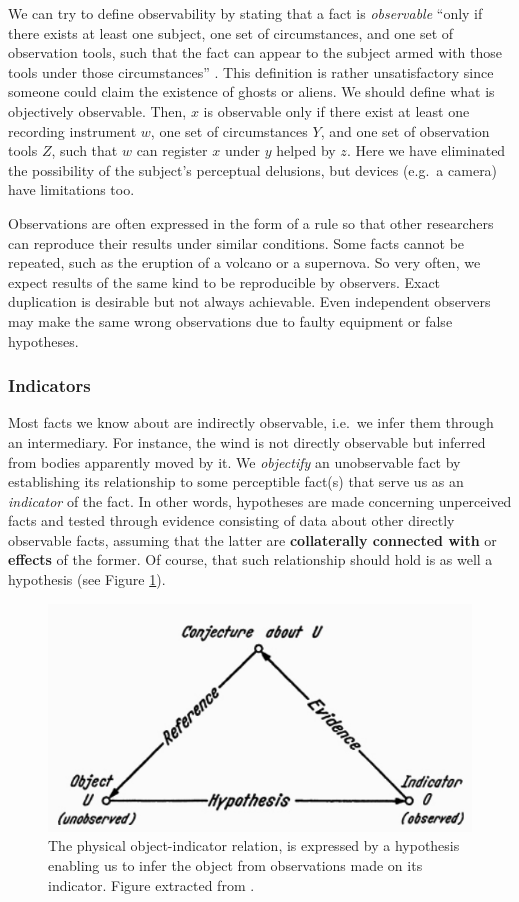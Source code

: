 \documentclass[
]{book}
\begin{document}
We can try to define observability by stating that a fact is \emph{observable} ``only if there exists at least one subject, one set of circumstances, and one set of observation tools, such that the fact can appear to the subject armed with those tools under those circumstances'' \citep{bunge2017philosophy}. This definition is rather unsatisfactory since someone could claim the existence of ghosts or aliens. We should define what is objectively observable. Then, \(x\) is observable only if there exist at least one recording instrument \(w\), one set of circumstances \(Y\), and one set of observation tools \(Z\), such that \(w\) can register \(x\) under \(y\) helped by \(z\). Here we have eliminated the possibility of the subject's perceptual delusions, but devices (e.g.~a camera) have limitations too.

Observations are often expressed in the form of a rule so that other researchers can reproduce their results under similar conditions. Some facts cannot be repeated, such as the eruption of a volcano or a supernova. So very often, we expect results of the same kind to be reproducible by observers. Exact duplication is desirable but not always achievable. Even independent observers may make the same wrong observations due to faulty equipment or false hypotheses.

\hypertarget{indicators}{%
\subsubsection{Indicators}\label{indicators}}

Most facts we know about are indirectly observable, i.e.~we infer them through an intermediary. For instance, the wind is not directly observable but inferred from bodies apparently moved by it. We \emph{objectify} an unobservable fact by establishing its relationship to some perceptible fact(s) that serve us as an \emph{indicator} of the fact. In other words, hypotheses are made concerning unperceived facts and tested through evidence consisting of data about other directly observable facts, assuming that the latter are \textbf{collaterally connected with} or \textbf{effects} of the former. Of course, that such relationship should hold is as well a hypothesis (see Figure \ref{fig:indicator}).



\begin{figure}

{\centering \includegraphics[width=0.5\linewidth]{Figures/indicator} 

}

\caption{The physical object-indicator relation, is expressed by a hypothesis enabling us to infer the object from observations made on its indicator. Figure extracted from \citep{bunge2017philosophy}.}\label{fig:indicator}
\end{figure}
\end{document}
